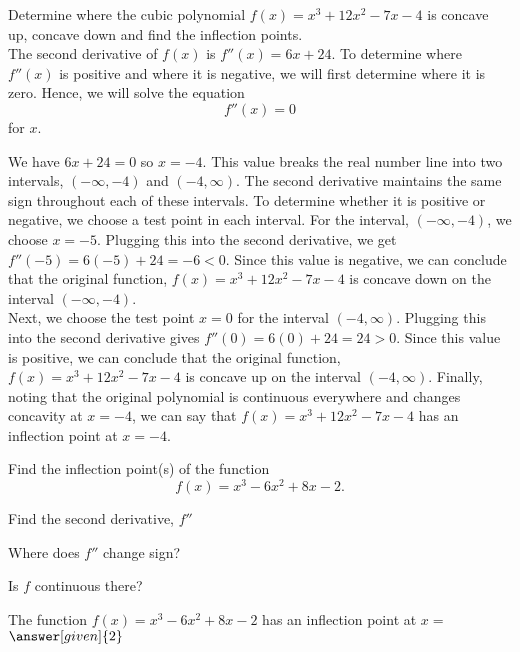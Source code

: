 \documentclass{ximera}
\begin{document}
 
 

\begin{example} %
Determine where the cubic polynomial $f(x) = x^3 + 12x^2 - 7x - 4$ is concave up, concave down and find the inflection points.\\
The second derivative of $f(x)$ is 
$f''(x) = 6x + 24$.  To determine where $f''(x)$ is positive and where it is negative, 
we will first determine where it is zero. Hence, we will solve the equation
\[f''(x) = 0\]
for $x$.

We have $6x + 24 = 0$ so $x = -4$.
This value breaks the real number line into two intervals, $(-\infty, -4)$ and $(-4, \infty)$.
The second derivative maintains the same sign throughout each of these intervals.  
To determine whether it is positive or negative, we choose a test point in each interval.
For the interval, $(-\infty, -4)$, we choose $x = -5$.  Plugging this into the second derivative, we get
$f''(-5) = 6(-5) + 24 = -6 < 0$.  Since this value is negative, we can conclude that the original function,
$f(x) = x^3 + 12x^2 - 7x - 4$ is concave down on the interval $(-\infty, -4)$. \\

Next, we choose the test point 
$x = 0$ for the interval $(-4, \infty)$.  Plugging this into the second derivative gives $f''(0) = 6(0) + 24 = 24 > 0$.
Since this value is positive, we can conclude that the original function,
$f(x) = x^3 + 12x^2 - 7x - 4$ is concave up on the interval $(-4, \infty)$.
Finally, noting that the original polynomial is continuous everywhere and changes concavity at $x = -4$, we can say that
$f(x) = x^3 + 12x^2 - 7x - 4$ has an inflection point at $x = -4$.
\end{example}


\begin{problem} %
  Find the inflection point(s) of the function
  \[
     f(x) = x^3 - 6x^2 + 8x - 2.
  \]
 
    \begin{hint}
      Find the second derivative, $f''$
    \end{hint}
    \begin{hint}
      Where does $f''$ change sign?
    \end{hint}
    \begin{hint}
      Is $f$ continuous there?
    \end{hint}    
		The function $f(x) = x^3 - 6x^2 + 8x - 2$ has an inflection point at $x =$
		 $\answer[given]{2}$
	
\end{problem}
\end{document}
